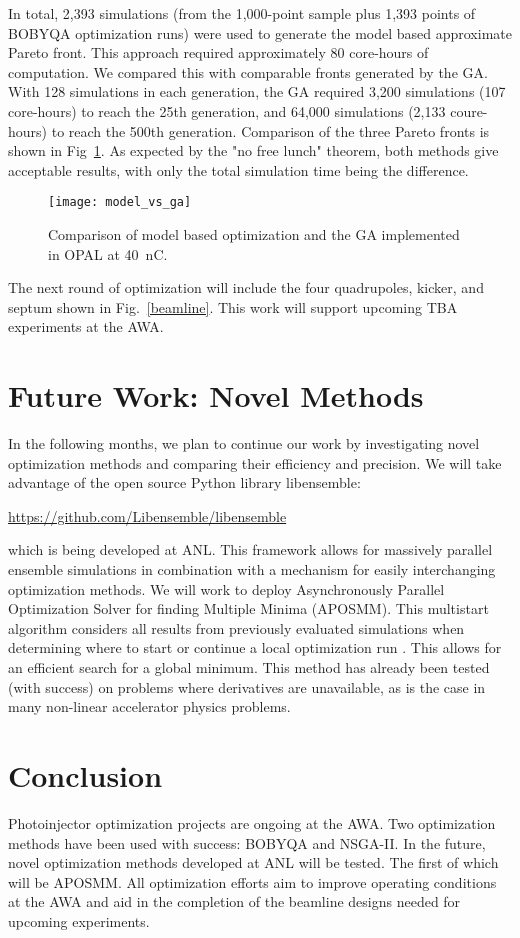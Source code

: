 \documentclass[letterpaper,  %
              ]{jacow-2_3}   %
\newcommand{\lsnote}[1]{\textsf{{\color{violet}{ LS note:}   #1 }}}
\begin{document}
In total, 2,393 simulations (from the 1,000-point sample plus 
1,393 points of  BOBYQA optimization runs) were used to
generate the model based approximate Pareto front. 
This approach required approximately 80 core-hours of computation. 
We compared this with comparable fronts generated by the GA.
With 128 simulations in each generation, the GA required 3,200 
simulations (107 core-hours) to reach the 25th generation, and 64,000 simulations
(2,133 coure-hours) to reach the 500th generation. 
Comparison of the three Pareto fronts is shown in Fig~\ref{compare}.
As expected by the "no free lunch" theorem, both methods give 
acceptable results, with only the total simulation time being 
the difference. 
\begin{figure}
	\texttt{[image: model\_vs\_ga]}
	\caption{Comparison of model based optimization and the GA implemented in OPAL at \SI{40}{nC}. }
	\label{compare}
\end{figure}

The next round of optimization will include the four quadrupoles, 
kicker, and septum shown in Fig.~\ref{beamline}. This work 
will support upcoming TBA experiments at the AWA.

\section{Future Work: Novel Methods}
In the following months, we plan to continue our work 
by investigating novel optimization methods and comparing their efficiency and precision. 
We will take advantage of the 
open source Python library libensemble:
\begin{center}
	\url{https://github.com/Libensemble/libensemble}
\end{center} 
which is being developed at ANL.
This framework allows for massively parallel ensemble simulations in 
combination with a mechanism for easily interchanging optimization methods. 
We will work to deploy Asynchronously Parallel Optimization Solver for finding Multiple Minima (APOSMM).
This multistart algorithm considers all results from previously evaluated simulations when determining where to start or continue a local optimization run \cite{jeff}. This allows for an efficient 
search for a global minimum. This method has already been tested
(with success) on problems where derivatives are unavailable, 
as is the case in many non-linear accelerator physics problems. 


\section{Conclusion}
Photoinjector optimization projects are ongoing at the AWA.
Two optimization methods have been used with success:
BOBYQA and NSGA-II. In the future, novel optimization 
methods developed at ANL will be tested. The first of 
which will be APOSMM. All optimization efforts \lsnote{aim} to improve operating conditions at the AWA and 
\lsnote{aid in the completion of the beamline designs needed} for upcoming experiments.
\end{document}
